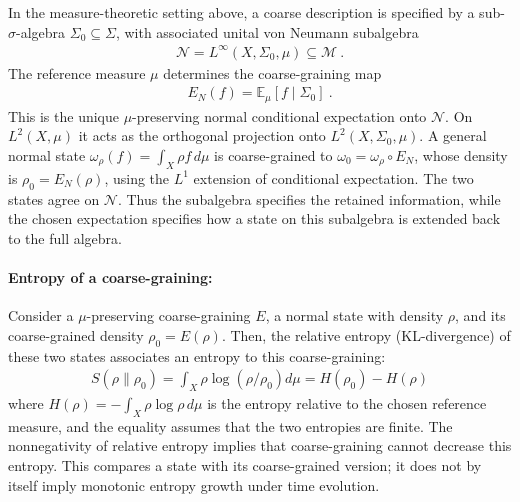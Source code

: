 \documentclass[a4paper,11pt]{article}
\theoremstyle{definition}
\begin{document}
In the measure-theoretic setting above, a coarse description is specified by a sub-$\sigma$-algebra $\Sigma_0\subseteq\Sigma$, with associated unital von Neumann subalgebra
\begin{align}
    \mathcal N=L^\infty(X,\Sigma_0,\mu)\subseteq\mathcal M\ .
\end{align}
The reference measure $\mu$ determines the coarse-graining map
\begin{align}
    E_N(f)=\mathbb E_\mu[f\mid\Sigma_0]\ .
\end{align}
This is the unique $\mu$-preserving normal conditional expectation onto $\mathcal N$. On $L^2(X,\mu)$ it acts as the orthogonal projection onto $L^2(X,\Sigma_0,\mu)$. A general normal state $\omega_\rho(f)=\int_X\rho f\,d\mu$ is coarse-grained to $\omega_0=\omega_\rho\circ E_N$, whose density is $\rho_0=E_N(\rho)$, using the $L^1$ extension of conditional expectation. The two states agree on $\mathcal N$. Thus the subalgebra specifies the retained information, while the chosen expectation specifies how a state on this subalgebra is extended back to the full algebra.


\paragraph{Entropy of a coarse-graining:} Consider a $\mu$-preserving coarse-graining $E$, a normal state with density $\rho$, and its coarse-grained density $\rho_0=E(\rho)$. Then, the relative entropy (KL-divergence) of these two states associates an entropy to this coarse-graining:
\begin{align}
    \label{eq:KL-classical}
    S(\rho\|\rho_0)=\int_X \rho \log(\rho/\rho_0)d\mu=H(\rho_0)-H(\rho)
\end{align}
where $H(\rho)=-\int_X\rho\log\rho\,d\mu$ is the entropy relative to the chosen reference measure, and the equality assumes that the two entropies are finite. The nonnegativity of relative entropy implies that coarse-graining cannot decrease this entropy. This compares a state with its coarse-grained version; it does not by itself imply monotonic entropy growth under time evolution.
\end{document}
